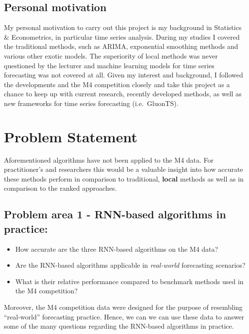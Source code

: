 \documentclass[11pt]{article}
\providecommand{\tightlist}{%
      \setlength{\itemsep}{0pt}\setlength{\parskip}{0pt}}
\begin{document}
\hypertarget{personal-motivation}{%
\subsection{Personal motivation}\label{personal-motivation}}

My personal motivation to carry out this project is my background in
Statistics \& Econometrics, in particular time series analysis. During
my studies I covered the traditional methods, such as ARIMA, exponential
smoothing methods and various other exotic models. The superiority of
local methods was never questioned by the lecturer and machine learning
models for time series forecasting was not covered at all. Given my
interest and background, I followed the developments and the M4
competition closely and take this project as a chance to keep up with
current research, recently developed methods, as well as new frameworks
for time series forecasting (i.e.~GluonTS).

    \hypertarget{problem-statement}{%
\section{Problem Statement}\label{problem-statement}}

Aforementioned algorithms have not been applied to the M4 data. For
practitioner's and researchers this would be a valuable insight into how
accurate these methods perform in comparison to traditional,
\textbf{local} methods as well as in comparison to the ranked
approaches.

\hypertarget{problem-area-1---rnn-based-algorithms-in-practice}{%
\subsection{Problem area 1 - RNN-based algorithms in
practice:}\label{problem-area-1---rnn-based-algorithms-in-practice}}

\begin{itemize}
\tightlist
\item
  How accurate are the three RNN-based algorithms on the M4 data?
\item
  Are the RNN-based algorithms applicable in \emph{real-world}
  forecasting scenarios?
\item
  What is their relative performance compared to benchmark methods used
  in the M4 competition?
\end{itemize}

Moreover, the M4 competition data were designed for the purpose of
resembling ``real-world'' forecasting practice. Hence, we can we can use
these data to answer some of the many questions regarding the RNN-based
algorithms in practice.
\end{document}
